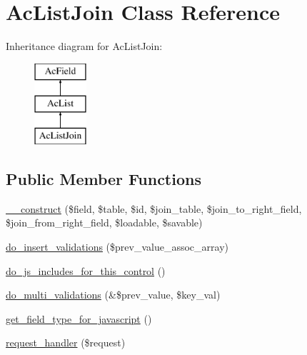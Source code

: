 \hypertarget{class_ac_list_join}{\section{\-Ac\-List\-Join \-Class \-Reference}
\label{class_ac_list_join}
}
\-Inheritance diagram for \-Ac\-List\-Join\-:\begin{figure}[H]
\begin{center}
\leavevmode
\includegraphics[height=3.000000cm]{class_ac_list_join}
\end{center}
\end{figure}
\subsection*{\-Public \-Member \-Functions}
\begin{DoxyCompactItemize}
\item 
\hyperlink{class_ac_list_join_af52f9ac707c7bf77e4433ec0429de4bc}{\-\_\-\-\_\-construct} (\$field, \$table, \$id, \$join\-\_\-table, \$join\-\_\-to\-\_\-right\-\_\-field, \$join\-\_\-from\-\_\-right\-\_\-field, \$loadable, \$savable)
\item 
\hyperlink{class_ac_list_join_a562a3fd3d3f6e97f556e7547c3ba0534}{do\-\_\-insert\-\_\-validations} (\$prev\-\_\-value\-\_\-assoc\-\_\-array)
\item 
\hyperlink{class_ac_list_join_afe52ff2e5403fdb103f85ddf4da6def8}{do\-\_\-js\-\_\-includes\-\_\-for\-\_\-this\-\_\-control} ()
\item 
\hyperlink{class_ac_list_join_a72e097dcd60de3beb18babea17188184}{do\-\_\-multi\-\_\-validations} (\&\$prev\-\_\-value, \$key\-\_\-val)
\item 
\hyperlink{class_ac_list_join_a4bffcad348a63a2825136b2fa39fe849}{get\-\_\-field\-\_\-type\-\_\-for\-\_\-javascript} ()
\item 
\hyperlink{class_ac_list_join_abde3fea649f4e1db70a5f2bcf45e42db}{request\-\_\-handler} (\$request)
\end{DoxyCompactItemize}
